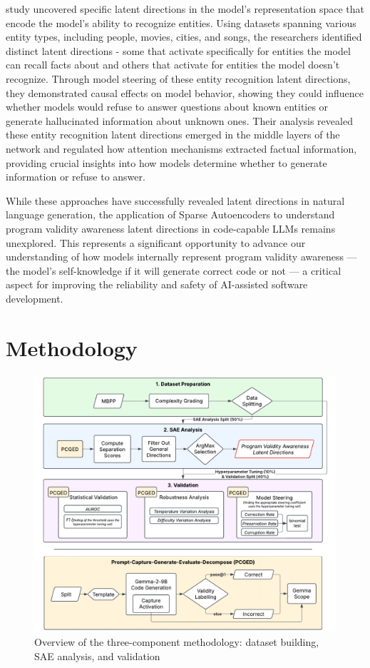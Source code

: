 \documentclass[11pt]{article}
\begin{document}
\citet{ferrando2024know} study uncovered specific latent directions in the model's representation space that encode the model's ability to recognize entities. Using datasets spanning various entity types, including people, movies, cities, and songs, the researchers identified distinct latent directions - some that activate specifically for entities the model can recall facts about and others that activate for entities the model doesn't recognize. Through model steering of these entity recognition latent directions, they demonstrated causal effects on model behavior, showing they could influence whether models would refuse to answer questions about known entities or generate hallucinated information about unknown ones. Their analysis revealed these entity recognition latent directions emerged in the middle layers of the network and regulated how attention mechanisms extracted factual information, providing crucial insights into how models determine whether to generate information or refuse to answer.

While these approaches have successfully revealed latent directions in natural language generation, the application of Sparse Autoencoders to understand program validity awareness latent directions in code-capable LLMs remains unexplored. This represents a significant opportunity to advance our understanding of how models internally represent program validity awareness — the model's self-knowledge if it will generate correct code or not — a critical aspect for improving the reliability and safety of AI-assisted software development.

\section{Methodology}
\label{sec:methodology}

\begin{figure}[!ht]
    \centering
    \includegraphics[width=0.99\linewidth]{figures/methodology.pdf}
    \caption{Overview of the three-component methodology: dataset building, SAE analysis, and validation}
    \label{fig:methodology}
\end{figure}
\end{document}
